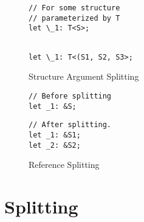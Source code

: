 \documentclass[12pt,oneside]{book}
\begin{document}
\begin{figure*}
  \begin{minipage}[t]{0.5\linewidth}
\begin{verbatim}
// For some structure 
// parameterized by T
let \_1: T<S>;
\end{verbatim}
  \end{minipage}
  \begin{minipage}[t]{0.5\linewidth}
\begin{verbatim}

let \_1: T<(S1, S2, S3>;
\end{verbatim}
  \end{minipage}
  \caption{Structure Argument Splitting}
  \label{fig:localdeclbefore}
\end{figure*}



  
\begin{figure*}
  \begin{minipage}[t]{0.5\linewidth}
\begin{verbatim}
// Before splitting
let _1: &S;
\end{verbatim}
  \end{minipage}
  \begin{minipage}[t]{0.5\linewidth}
\begin{verbatim}
// After splitting.
let _1: &S1;
let _2: &S2;
\end{verbatim}
  \end{minipage}
  \caption{Reference Splitting}
  \label{fig:refedecl}
\end{figure*}

\section{Splitting}
\label{sec:splitting}
\end{document}
